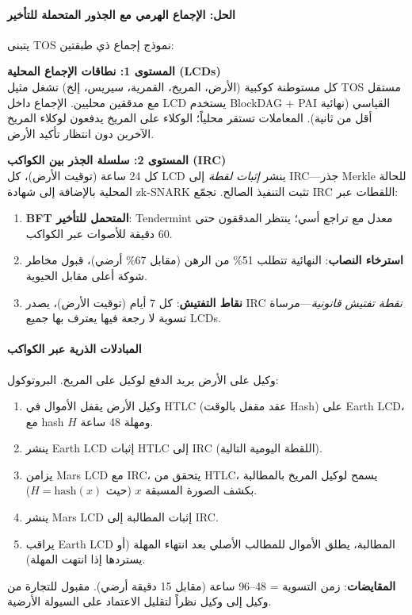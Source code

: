 \documentclass[11pt]{article}
\begin{document}
\paragraph{الحل: الإجماع الهرمي مع الجذور المتحملة للتأخير}
يتبنى TOS نموذج إجماع ذي طبقتين:

\textbf{المستوى 1: نطاقات الإجماع المحلية (LCDs)}\\
كل مستوطنة كوكبية (الأرض، المريخ، القمرية، سيريس، إلخ) تشغل مثيل TOS مستقل مع مدققين محليين. الإجماع داخل LCD يستخدم BlockDAG + PAI القياسي (نهائية أقل من ثانية). المعاملات تستقر محلياً؛ الوكلاء على المريخ يدفعون لوكلاء المريخ الآخرين دون انتظار تأكيد الأرض.

\textbf{المستوى 2: سلسلة الجذر بين الكواكب (IRC)}\\
كل 24 ساعة (توقيت الأرض)، كل LCD ينشر \emph{إثبات لقطة} إلى IRC—جذر Merkle للحالة المحلية بالإضافة إلى شهادة zk-SNARK تثبت التنفيذ الصالح. تجمّع IRC اللقطات عبر:
\begin{enumerate}[noitemsep]
  \item \textbf{BFT المتحمل للتأخير}: Tendermint معدل مع تراجع أسي؛ ينتظر المدققون حتى 60 دقيقة للأصوات عبر الكواكب.
  \item \textbf{استرخاء النصاب}: النهائية تتطلب 51\% من الرهن (مقابل 67\% أرضي)، قبول مخاطر شوكة أعلى مقابل الحيوية.
  \item \textbf{نقاط التفتيش}: كل 7 أيام (توقيت الأرض)، يصدر IRC \emph{نقطة تفتيش قانونية}—مرساة تسوية لا رجعة فيها يعترف بها جميع LCDs.
\end{enumerate}

\paragraph{المبادلات الذرية عبر الكواكب}
وكيل على الأرض يريد الدفع لوكيل على المريخ. البروتوكول:
\begin{enumerate}[noitemsep]
  \item وكيل الأرض يقفل الأموال في HTLC (عقد مقفل بالوقت Hash) على Earth LCD، مع hash $H$ ومهلة 48 ساعة.
  \item ينشر Earth LCD إثبات HTLC إلى IRC (اللقطة اليومية التالية).
  \item يزامن Mars LCD مع IRC، يتحقق من HTLC، يسمح لوكيل المريخ بالمطالبة بكشف الصورة المسبقة $x$ (حيث $H = \text{hash}(x)$).
  \item ينشر Mars LCD إثبات المطالبة إلى IRC.
  \item يراقب Earth LCD المطالبة، يطلق الأموال للمطالب الأصلي بعد انتهاء المهلة (أو يستردها إذا انتهت المهلة).
\end{enumerate}
\textbf{المقايضات}: زمن التسوية = 48--96 ساعة (مقابل 15 دقيقة أرضي). مقبول للتجارة من وكيل إلى وكيل نظراً لتقليل الاعتماد على السيولة الأرضية.
\end{document}
